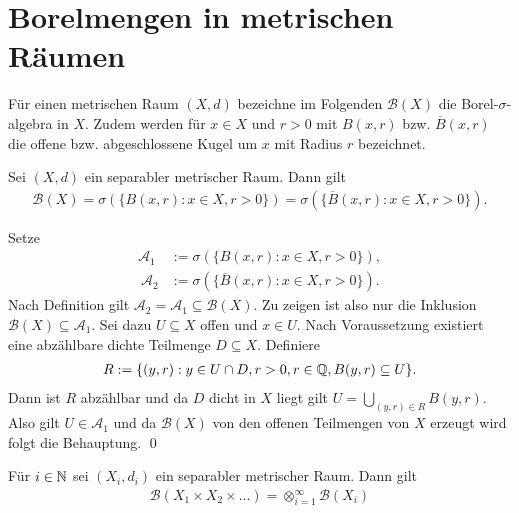 \section{Borelmengen in metrischen Räumen}
Für einen metrischen Raum $(X,d)$ bezeichne im Folgenden $\mathcal{B}(X)$ die Borel-$\sigma$-algebra in $X$. 
Zudem werden für $x \in X$ und $r>0$ mit $B(x, r)$ bzw. $\overline{B}(x,r)$ die offene bzw. abgeschlossene Kugel um $x$ mit Radius $r$ bezeichnet.
\begin{proposition}
    Sei $(X,d)$ ein separabler metrischer Raum. Dann gilt
    \begin{align*}
        \mathcal{B}(X) = \sigma(\{B(x,r): x \in X, r > 0 \}) = \sigma(\{\overline{B}(x,r): x \in X, r > 0 \}). 
    \end{align*}
\end{proposition}
\begin{proof*}
    Setze 
    \begin{align*}
        \mathcal{A}_1 &:= \sigma(\{B(x,r): x \in X, r > 0 \}), \\\ 
        \mathcal{A}_2 &:= \sigma(\{\overline{B}(x,r): x \in X, r > 0 \}). 
    \end{align*}
    Nach  Definition gilt $\mathcal{A}_2 = \mathcal{A}_1 \subseteq \mathcal{B}(X)$. Zu zeigen ist also nur die Inklusion $\mathcal{B}(X) \subseteq \mathcal{A}_1$.
    Sei dazu $U \subseteq X$ offen und $x \in U$. Nach Voraussetzung existiert eine abzählbare dichte Teilmenge $D \subseteq X$. Definiere 
    \begin{align*}
        R := \{(y,r) : y \in U \cap D, r > 0, r \in \mathbb{Q}, B(y,r) \subseteq U \}.
    \end{align*}
    Dann ist $R$ abzählbar und da $D$ dicht in $X$ liegt gilt $U = \bigcup_{(y,r) \in R}B(y,r)$. 
    Also gilt $U \in \mathcal{A}_1$ und da $\mathcal{B}(X)$ von den offenen Teilmengen von $X$ erzeugt wird folgt die Behauptung. \qed
\end{proof*}

\begin{proposition}
    Für $i \in \mathbb{N}$ sei $(X_i, d_i)$ ein separabler metrischer Raum. Dann gilt
    \begin{align*}
        \mathcal{B}(X_1 \times X_2 \times ...) = \otimes_{i=1}^{\infty}\mathcal{B}(X_i)
    \end{align*}
\end{proposition}

